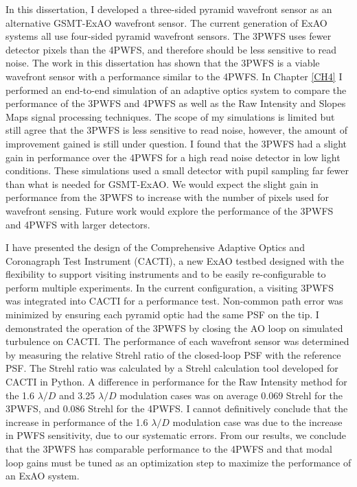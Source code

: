 In this dissertation, I developed a three-sided pyramid wavefront sensor as an alternative GSMT-ExAO wavefront sensor. The current generation of ExAO systems all use four-sided pyramid wavefront sensors. The 3PWFS uses fewer detector pixels than the 4PWFS, and therefore should be less sensitive to read noise. The work in this dissertation has shown that the 3PWFS is a viable wavefront sensor with a performance similar to the 4PWFS. In Chapter \ref{CH4} I performed an end-to-end simulation of an adaptive optics system to compare the performance of the 3PWFS and 4PWFS as well as the Raw Intensity and Slopes Maps signal processing techniques. The scope of my simulations is limited but still agree that the 3PWFS is less sensitive to read noise, however, the amount of improvement gained is still under question. I found that the 3PWFS had a slight gain in performance over the 4PWFS for a high read noise detector in low light conditions. These simulations used a small detector with pupil sampling far fewer than what is needed for GSMT-ExAO. We would expect the slight gain in performance from the 3PWFS to increase with the number of pixels used for wavefront sensing. Future work would explore the performance of the 3PWFS and 4PWFS with larger detectors.

I have presented the design of the Comprehensive Adaptive Optics and Coronagraph Test Instrument (CACTI), a new ExAO testbed designed with the flexibility to support visiting instruments and to be easily re-configurable to perform multiple experiments. In the current configuration, a visiting 3PWFS was integrated into CACTI for a performance test. Non-common path error was minimized by ensuring each pyramid optic had the same PSF on the tip. I demonstrated the operation of the 3PWFS by closing the AO loop on simulated turbulence on CACTI. The performance of each wavefront sensor was determined by measuring the relative Strehl ratio of the closed-loop PSF with the reference PSF. The Strehl ratio was calculated by a Strehl calculation tool developed for CACTI in Python. A difference in performance for the Raw Intensity method for the 1.6 $\lambda/D$ and 3.25 $\lambda/D$ modulation cases was on average 0.069 Strehl for the 3PWFS, and 0.086 Strehl for the 4PWFS. I cannot definitively conclude that the increase in performance of the 1.6 $\lambda/D$ modulation case was due to the increase in PWFS sensitivity, due to our systematic errors. From our results, we conclude that the 3PWFS has comparable performance to the 4PWFS and that modal loop gains must be tuned as an optimization step to maximize the performance of an ExAO system. 

